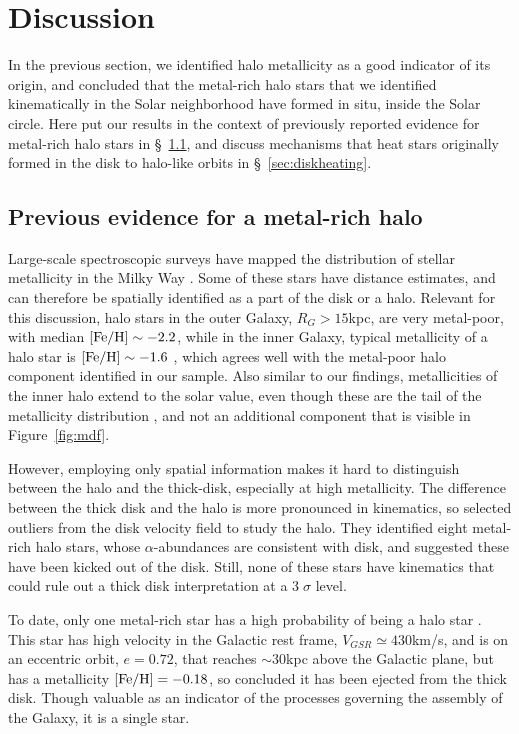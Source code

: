 \documentclass[apj, twocolappendix, numberedappendix, appendixfloats]{emulateapj}
\begin{document}
\section{Discussion}

In the previous section, we identified halo metallicity as a good indicator of its origin, and concluded that the metal-rich halo stars that we identified kinematically in the Solar neighborhood have formed in situ, inside the Solar circle.
Here put our results in the context of previously reported evidence for metal-rich halo stars in \S~\ref{sec:previous}, and discuss mechanisms that heat stars originally formed in the disk to halo-like orbits in \S~\ref{sec:diskheating}.

\subsection{Previous evidence for a metal-rich halo}
\label{sec:previous}
Large-scale spectroscopic surveys have mapped the distribution of stellar metallicity in the Milky Way \citep[e.g.,][]{ivezic2008}.
Some of these stars have distance estimates, and can therefore be spatially identified as a part of the disk or a halo.
Relevant for this discussion, halo stars in the outer Galaxy, $R_{G}>15$\;kpc, are very metal-poor, with median $\rm[Fe/H]\sim-2.2$, while in the inner Galaxy, typical metallicity of a halo star is $\rm[Fe/H]\sim-1.6$ \citep[e.g.,][]{carollo2007, dejong2010}, which agrees well with the metal-poor halo component identified in our sample.
Also similar to our findings, metallicities of the inner halo extend to the solar value, even though these are the tail of the metallicity distribution \citep[e.g.,][]{allendeprieto2006}, and not an additional component that is visible in Figure~\ref{fig:mdf}.

However, employing only spatial information makes it hard to distinguish between the halo and the thick-disk, especially at high metallicity.
The difference between the thick disk and the halo is more pronounced in kinematics, so \citet{sheffield2012} selected outliers from the disk velocity field to study the halo.
They identified eight metal-rich halo stars, whose $\alpha$-abundances are consistent with disk, and suggested these have been kicked out of the disk.
Still, none of these stars have kinematics that could rule out a thick disk interpretation at a $3\;\sigma$ level.

To date, only one metal-rich star has a high probability of being a halo star \citep{hawkins2015}.
This star has high velocity in the Galactic rest frame, $V_{GSR}\simeq430$\;km/s, and is on an eccentric orbit, $e=0.72$, that reaches $\sim30$\;kpc above the Galactic plane, but has a metallicity $\rm[Fe/H]=-0.18$, so \citet{hawkins2015} concluded it has been ejected from the thick disk.
Though valuable as an indicator of the processes governing the assembly of the Galaxy, it is a single star.
\end{document}
